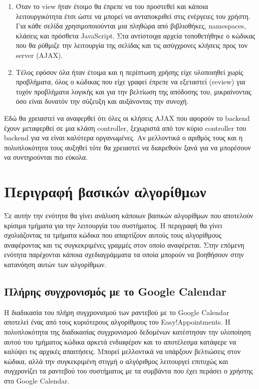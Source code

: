 \begin{enumerate}
\item Όταν το view ήταν έτοιμο θα έπρεπε να του προστεθεί και κάποια λειτουργικότητα έτσι ώστε να μπορεί να ανταποκριθεί στις ενέργειες του χρήστη. Για κάθε σελίδα χρησιμοποιούνται μια πληθώρα από βιβλιοθήκες, namespaces, κλάσεις και πρόσθετα JavaScript. Στα αντίστοιχα αρχεία τοποθετήθηκε ο κώδικας που θα ρύθμιζε την λειτουργία της σελίδας και τις ασύγχρονες κλήσεις προς τον server (AJAX). 
\item Τέλος εφόσον όλα ήταν έτοιμα και η περίπτωση χρήσης είχε υλοποιηθεί χωρίς προβλήματα, όλος ο κώδικας που είχε γραφεί έπρεπε να εξεταστεί (review) για τυχόν προβλήματα λογικής και για την βελτίωση της απόδοσης του, μικραίνοντας όσο είναι δυνατόν την σύζευξη και αυξάνοντας την συνοχή.
\end{enumerate}

Εδώ θα χρειαστεί να αναφερθεί ότι όλες οι κλήσεις AJAX που αφορούν το backend έχουν μεταφερθεί σε μια κλάση controller, ξεχωριστά από τον κύριο controller του backend για να είναι καλύτερα οργανωμένες. Αν μελλοντικά ο αριθμός τους και η πολυπλοκότητα τους αυξηθεί τότε θα χρειαστεί να διαιρεθούν ξανά για να μπορέσουν να συντηρούνται πιο εύκολα.

\section{Περιγραφή βασικών αλγορίθμων}
Σε αυτήν την ενότητα θα γίνει ανάλυση κάποιων βασικών αλγορίθμων που αποτελούν κρίσιμα τμήματα για την λειτουργία του συστήματος. Η περιγραφή θα γίνει σχολιάζοντας τα τμήματα κώδικα που απαρτίζουν αυτούς τους αλγορίθμους αναφέροντας και τις συγκεκριμένες γραμμές στον οποίο αναφέρεται. Στην επόμενη ενότητα παρέχονται κάποια σχεδιαγράμματα τα οποία μπορούν να βοηθήσουν στην κατανόηση αυτών των αλγορίθμων.

\subsection{Πλήρης συγχρονισμός με το Google Calendar}
Η διαδικασία του πλήρη συγχρονισμού των ραντεβού με το Google Calendar αποτελεί ένας από τους κυριότερους αλγορίθμους του Easy!Appointments. Η πολυπλοκότητα της διαδικασίας συγχρονισμού δεδομένων κατέστησαν την υλοποίηση αυτού του τμήματος κώδικα αρκετά ενδιαφέρον και το αποτέλεσμα κατάφερε να καλύψει τις αρχικές απαιτήσεις. Μπορεί μελλοντικά να υπάρξουν βελτιώσεις στον κώδικα, αλλά την συγκεκριμένη στιγμή ο αλγόριθμος λειτουργεί επιτυχώς και συγχρονίζει τα ραντεβού του συστήματος με τα συμβάντα που έχει περάσει ο χρήστης στο Google Calendar.


